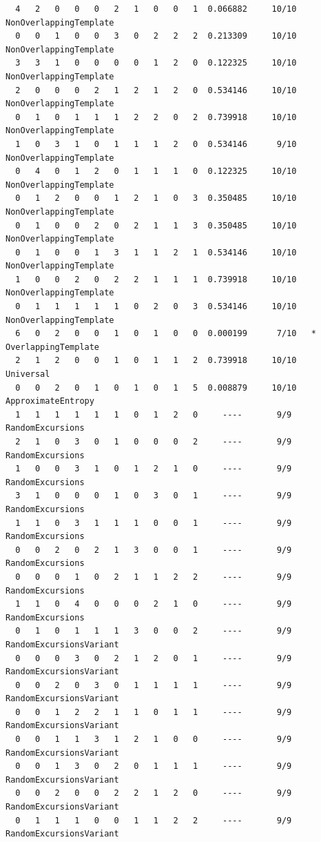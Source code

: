 \documentclass[12pt, titlepage]{report}
\theoremstyle{definition}
\begin{document}
\begin{verbatim}
  4   2   0   0   0   2   1   0   0   1  0.066882     10/10      NonOverlappingTemplate
  0   0   1   0   0   3   0   2   2   2  0.213309     10/10      NonOverlappingTemplate
  3   3   1   0   0   0   0   1   2   0  0.122325     10/10      NonOverlappingTemplate
  2   0   0   0   2   1   2   1   2   0  0.534146     10/10      NonOverlappingTemplate
  0   1   0   1   1   1   2   2   0   2  0.739918     10/10      NonOverlappingTemplate
  1   0   3   1   0   1   1   1   2   0  0.534146      9/10      NonOverlappingTemplate
  0   4   0   1   2   0   1   1   1   0  0.122325     10/10      NonOverlappingTemplate
  0   1   2   0   0   1   2   1   0   3  0.350485     10/10      NonOverlappingTemplate
  0   1   0   0   2   0   2   1   1   3  0.350485     10/10      NonOverlappingTemplate
  0   1   0   0   1   3   1   1   2   1  0.534146     10/10      NonOverlappingTemplate
  1   0   0   2   0   2   2   1   1   1  0.739918     10/10      NonOverlappingTemplate
  0   1   1   1   1   1   0   2   0   3  0.534146     10/10      NonOverlappingTemplate
  6   0   2   0   0   1   0   1   0   0  0.000199      7/10   *  OverlappingTemplate
  2   1   2   0   0   1   0   1   1   2  0.739918     10/10      Universal
  0   0   2   0   1   0   1   0   1   5  0.008879     10/10      ApproximateEntropy
  1   1   1   1   1   1   0   1   2   0     ----       9/9       RandomExcursions
  2   1   0   3   0   1   0   0   0   2     ----       9/9       RandomExcursions
  1   0   0   3   1   0   1   2   1   0     ----       9/9       RandomExcursions
  3   1   0   0   0   1   0   3   0   1     ----       9/9       RandomExcursions
  1   1   0   3   1   1   1   0   0   1     ----       9/9       RandomExcursions
  0   0   2   0   2   1   3   0   0   1     ----       9/9       RandomExcursions
  0   0   0   1   0   2   1   1   2   2     ----       9/9       RandomExcursions
  1   1   0   4   0   0   0   2   1   0     ----       9/9       RandomExcursions
  0   1   0   1   1   1   3   0   0   2     ----       9/9       RandomExcursionsVariant
  0   0   0   3   0   2   1   2   0   1     ----       9/9       RandomExcursionsVariant
  0   0   2   0   3   0   1   1   1   1     ----       9/9       RandomExcursionsVariant
  0   0   1   2   2   1   1   0   1   1     ----       9/9       RandomExcursionsVariant
  0   0   1   1   3   1   2   1   0   0     ----       9/9       RandomExcursionsVariant
  0   0   1   3   0   2   0   1   1   1     ----       9/9       RandomExcursionsVariant
  0   0   2   0   0   2   2   1   2   0     ----       9/9       RandomExcursionsVariant
  0   1   1   1   0   0   1   1   2   2     ----       9/9       RandomExcursionsVariant

\end{verbatim}
\end{document}
